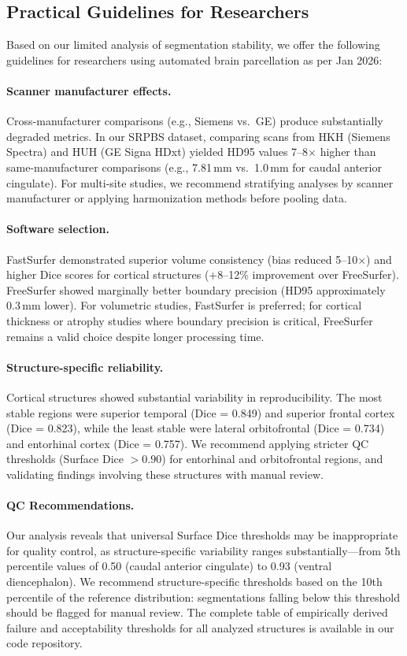 \documentclass{midl} %
\begin{document}
\subsection{Practical Guidelines for Researchers}

Based on our limited analysis of segmentation stability, we offer the following guidelines for researchers using automated brain parcellation as per Jan 2026:

\paragraph{Scanner manufacturer effects.}
Cross-manufacturer comparisons (e.g., Siemens vs.\ GE) produce substantially degraded metrics. In our SRPBS dataset, comparing scans from HKH (Siemens Spectra) and HUH (GE Signa HDxt) yielded HD95 values 7--8$\times$ higher than same-manufacturer comparisons (e.g., 7.81\,mm vs.\ 1.0\,mm for caudal anterior cingulate). For multi-site studies, we recommend stratifying analyses by scanner manufacturer or applying harmonization methods before pooling data.

\paragraph{Software selection.}
FastSurfer demonstrated superior volume consistency (bias reduced 5--10$\times$) and higher Dice scores for cortical structures (+8--12\% improvement over FreeSurfer). FreeSurfer showed marginally better boundary precision (HD95 approximately 0.3\,mm lower). For volumetric studies, FastSurfer is preferred; for cortical thickness or atrophy studies where boundary precision is critical, FreeSurfer remains a valid choice despite longer processing time.

\paragraph{Structure-specific reliability.}
Cortical structures showed substantial variability in reproducibility. The most stable regions were superior temporal (Dice = 0.849) and superior frontal cortex (Dice = 0.823), while the least stable were lateral orbitofrontal (Dice = 0.734) and entorhinal cortex (Dice = 0.757). We recommend applying stricter QC thresholds (Surface Dice $>0.90$) for entorhinal and orbitofrontal regions, and validating findings involving these structures with manual review.

\paragraph{QC Recommendations.}
Our analysis reveals that universal Surface Dice thresholds may be inappropriate for quality control, as structure-specific variability ranges substantially---from 5th percentile values of 0.50 (caudal anterior cingulate) to 0.93 (ventral diencephalon). We recommend structure-specific thresholds based on the 10th percentile of the reference distribution: segmentations falling below this threshold should be flagged for manual review. The complete table of empirically derived failure and acceptability thresholds for all analyzed structures is available in our code repository.
\end{document}
